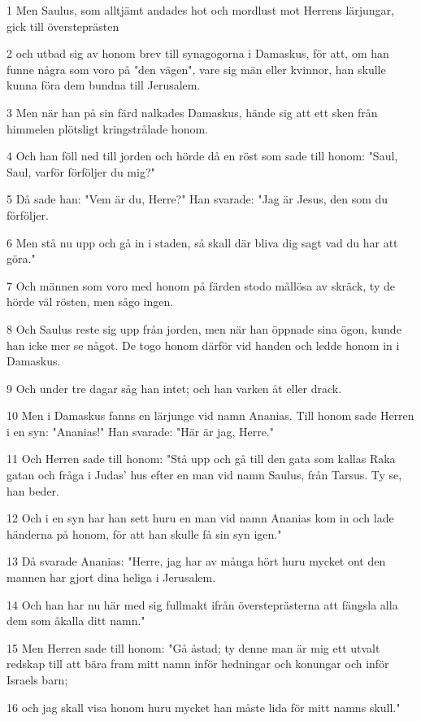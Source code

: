 \par 1 Men Saulus, som alltjämt andades hot och mordlust mot Herrens lärjungar, gick till översteprästen
\par 2 och utbad sig av honom brev till synagogorna i Damaskus, för att, om han funne några som voro på "den vägen", vare sig män eller kvinnor, han skulle kunna föra dem bundna till Jerusalem.
\par 3 Men när han på sin färd nalkades Damaskus, hände sig att ett sken från himmelen plötsligt kringstrålade honom.
\par 4 Och han föll ned till jorden och hörde då en röst som sade till honom: "Saul, Saul, varför förföljer du mig?"
\par 5 Då sade han: "Vem är du, Herre?" Han svarade: "Jag är Jesus, den som du förföljer.
\par 6 Men stå nu upp och gå in i staden, så skall där bliva dig sagt vad du har att göra."
\par 7 Och männen som voro med honom på färden stodo mållösa av skräck, ty de hörde väl rösten, men sågo ingen.
\par 8 Och Saulus reste sig upp från jorden, men när han öppnade sina ögon, kunde han icke mer se något. De togo honom därför vid handen och ledde honom in i Damaskus.
\par 9 Och under tre dagar såg han intet; och han varken åt eller drack.
\par 10 Men i Damaskus fanns en lärjunge vid namn Ananias. Till honom sade Herren i en syn: "Ananias!" Han svarade: "Här är jag, Herre."
\par 11 Och Herren sade till honom: "Stå upp och gå till den gata som kallas Raka gatan och fråga i Judas' hus efter en man vid namn Saulus, från Tarsus. Ty se, han beder.
\par 12 Och i en syn har han sett huru en man vid namn Ananias kom in och lade händerna på honom, för att han skulle få sin syn igen."
\par 13 Då svarade Ananias: "Herre, jag har av många hört huru mycket ont den mannen har gjort dina heliga i Jerusalem.
\par 14 Och han har nu här med sig fullmakt ifrån översteprästerna att fängsla alla dem som åkalla ditt namn."
\par 15 Men Herren sade till honom: "Gå åstad; ty denne man är mig ett utvalt redskap till att bära fram mitt namn inför hedningar och konungar och inför Israels barn;
\par 16 och jag skall visa honom huru mycket han måste lida för mitt namns skull."
